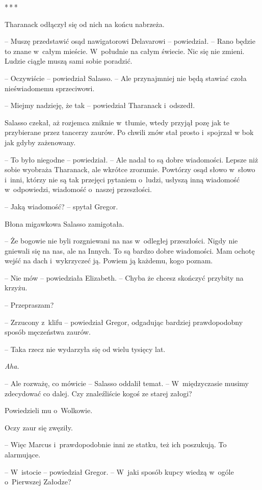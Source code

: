 \documentclass[oneside,polish,12pt,sfheadings]{mwbk}
\newcommand{\threeast}{\bigskip\par\centerline{*\,*\,*}\medskip\par}%
\begin{document}
\threeast

Tharanack odłączył się od nich na końcu nabrzeża.

-- Muszę przedstawić osąd nawigatorowi Delavarowi -- powiedział. -- Rano
będzie to znane w~całym mieście. W~południe na całym świecie. Nic się
nie zmieni. Ludzie ciągle muszą sami sobie poradzić.

-- Oczywiście -- powiedział Salasso. -- Ale przynajmniej nie będą stawiać
czoła nieświadomemu sprzeciwowi.

-- Miejmy nadzieję, że tak -- powiedział Tharanack i~odszedł.

Salasso czekał, aż rozjemca zniknie w~tłumie, wtedy przyjął pozę jak te
przybierane przez tancerzy zaurów. Po chwili znów stał prosto i~spojrzał
w bok jak gdyby zażenowany.

-- To było niegodne -- powiedział. -- Ale nadal to są dobre wiadomości.
Lepsze niż sobie wyobraża Tharanack, ale wkrótce zrozumie. Powtórzy osąd
słowo w~słowo i~inni, którzy nie są tak przejęci pytaniem o~ludzi,
usłyszą inną wiadomość w~odpowiedzi, wiadomość o~naszej przeszłości.

-- Jaką wiadomość? -- spytał Gregor.

Błona migawkowa Salasso zamigotała.

-- Że bogowie nie byli rozgniewani na nas w~odległej przeszłości. Nigdy
nie gniewali się na nas, ale na Innych. To są bardzo dobre wiadomości.
Mam ochotę wejść na dach i~wykrzyczeć ją. Powiem ją każdemu, kogo
poznam.

-- Nie mów -- powiedziała Elizabeth. -- Chyba że chcesz skończyć przybity
na krzyżu.

-- Przepraszam?

-- Zrzucony z~klifu -- powiedział Gregor, odgadując bardziej prawdopodobny
sposób męczeństwa zaurów.

-- Taka rzecz nie wydarzyła się od wielu tysięcy lat.

\emph{Aha.}

-- Ale rozważę, co mówicie -- Salasso oddalił temat. -- W~międzyczasie
musimy zdecydować co dalej. Czy znaleźliście kogoś ze starej załogi?

Powiedzieli mu o~Wolkowie.

Oczy zaur się zwęziły.

-- Więc Marcus i~prawdopodobnie inni ze statku, też ich poszukują. To
alarmujące.

-- W~istocie -- powiedział Gregor. -- W~jaki sposób kupcy wiedzą w~ogóle o~Pierwszej Załodze?
\end{document}
